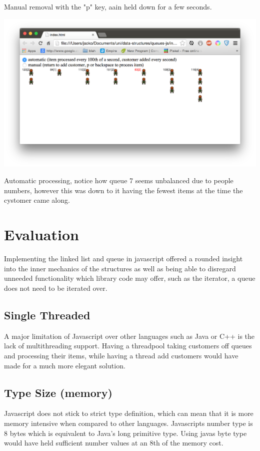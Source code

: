 \documentclass[pdftex,a4paper,10pt,titlepage]{article}
\begin{document}
Manual removal with the "p" key, aain held down for a few seconds.

\includegraphics[width=\textwidth]{screen3.png}

Automatic processing, notice how queue 7 seems unbalanced due to people numbers, however this was down to it having the fewest items at the time the cystomer came along.

\pagebreak
\section{Evaluation}
Implementing the linked list and queue in javascript offered a rounded insight into the inner mechanics of the structures as well as being able to disregard unneeded functionality which library code may offer, such as the iterator, a queue does not need to be iterated over. 
\subsection{Single Threaded}
A major limitation of Javascript over other languages such as Java or C++ is the lack of multithreading support. Having a threadpool taking customers off queues and processing their items, while having a thread add customers would have made for a much more elegant solution. 
\subsection{Type Size (memory)}
Javascript does not stick to strict type definition, which can mean that it is more memory intensive when compared to other languages. Javascripts number type is 8 bytes which is equivalent to Java’s long primitive type. Using javas byte type would have held sufficient number values at an 8th of the memory cost.
\end{document}
